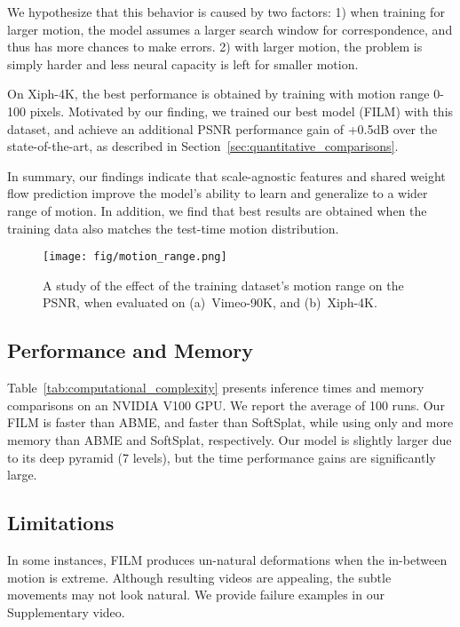 \documentclass[runningheads]{llncs}
\begin{document}
We hypothesize that this behavior is caused by two factors: 1) when training for larger motion, the model assumes a larger search window for correspondence, and thus has more chances to make errors. 2) with larger motion, the problem is simply harder and less neural capacity is left for smaller motion.

On Xiph-4K, the best performance is obtained by training with motion range 0-100 pixels. Motivated by our finding, we trained our best model (FILM) with this dataset, and achieve an additional PSNR performance gain of +0.5dB over the state-of-the-art, as described in Section~\ref{sec:quantitative_comparisons}.

In summary, our findings indicate that scale-agnostic features and shared weight flow prediction improve the model's ability to learn and generalize to a wider range of motion. In addition, we find that best results are obtained when the training data also matches the test-time motion distribution.
\label{sec:study_motion_ranges}

\begin{wrapfigure}{r}{0.5\textwidth}
 \vspace{-10ex}
  \begin{center}
    \texttt{[image: fig/motion\_range.png]}
  \end{center}
  \caption{A study of the effect of the training dataset's motion range on the PSNR, when evaluated on (a)~Vimeo-90K, and (b)~Xiph-4K. }
  \label{fig:motion_ranges}
  \vspace{-10ex}
\end{wrapfigure}

\subsection{Performance and Memory}
Table~\ref{tab:computational_complexity} presents inference times and memory comparisons on an NVIDIA V100 GPU. We report the average of 100 runs. Our FILM is \textbf{} faster than ABME, and \textbf{} faster than SoftSplat, while using only \textbf{} and \textbf{} more memory than ABME and SoftSplat, respectively. Our model is slightly larger due to its deep pyramid (7 levels), but the time performance gains are significantly large. 


\subsection{Limitations}
In some instances, FILM produces un-natural deformations when the in-between motion is extreme. Although resulting videos are appealing, the subtle movements may not look natural. We provide failure examples in our Supplementary video.
\end{document}
